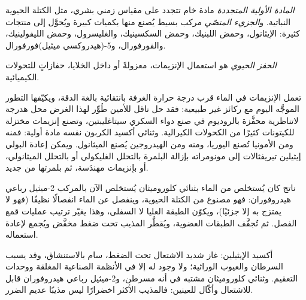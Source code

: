\begin{definition}\label{def:b3:green-industrial:feedstock}
\emph{المادة الأولية المتجددة} مادة خام
تتجدد على مقياس زمني بشري، مثل الكتلة الحيوية النباتية. و\emph{الجزيء
المنصّي} مركب بسيط يُصنع منها بكميات
كبيرة ويُحوَّل إلى منتجات كثيرة: الإيثانول، وحمض اللبنيك، وحمض السكسينيك،
والغليسرول، وحمض الليفولينيك، والفورفورال، و5-(هيدروكسي ميثيل)فورفورال.
\end{definition}

\begin{definition}\label{def:b3:green-industrial:biocatalysis}
\emph{الحفز الحيوي} هو استعمال الإنزيمات، معزولةً أو داخل
الخلايا، حفازاتٍ للتحولات الكيميائية.
\end{definition}

تعمل الإنزيمات في الماء قرب درجة حرارة الغرفة بانتقائية بالغة الدقة، 
ويكيّفها التطور الموجَّه اليوم مع ركائز غير طبيعية: فقد حل  ناقل للأمين
طُوِّر لهذا الغرض محل هدرجة لاتناظرية محفَّزة بالروديوم
في صنع دواء السكري سيتاغليبتين، وتصنع إنزيمات مختزلة للكيتونات كثيرًا من
الكحولات الكيرالية. وثنائي أكسيد الكربون نفسه مادة أولية: فمنه ومن الأمونيا
تُصنع اليوريا، ومنه ومن الهيدروجين يُصنع الميثانول. ويمكن إعادة البولي إيثيلين تيريفثالات
إلى مونومراته بإزالة البلمرة بالتحلل الغليكولي أو بالتحلل الميثانولي، أو
بإنزيمات مهندَسة، ثم بلمرتها من جديد.

\begin{inthelab}
ناتج كان يُستخلص من الماء بثنائي كلوروميثان يُستخلص
الآن بالمركب 2-ميثيل رباعي هيدروفوران: فهو مصنوع من الكتلة الحيوية، وينفصل
عن الماء انفصالًا نظيفًا (فهو لا يمتزج به إلا جزئيًا)، ويكوّن الطبقة العليا لا
السفلى، وهذا يغيّر ترتيب عمليات قمع الفصل. ثم تُجفَّف
الطبقات العضوية، ويُقطَّر المذيب تحت ضغط مخفَّض
ويُجمع لإعادة استعماله.
\end{inthelab}

\begin{safety}{}
أكسيد الإيثيلين: غاز شديد الاشتعال تحت الضغط، سام بالاستنشاق، وقد
يسبب السرطان والعيوب الوراثية؛ ولا وجود له إلا في الأنظمة الصناعية المغلقة
ووحدات التعقيم. وثنائي كلوروميثان مشتبه في أنه مسرطن، 
و2-ميثيل رباعي هيدروفوران قابل للاشتعال وأكّال للعينين: فالمذيب الأكثر اخضرارًا
ليس مذيبًا عديم الضرر.
\end{safety}


